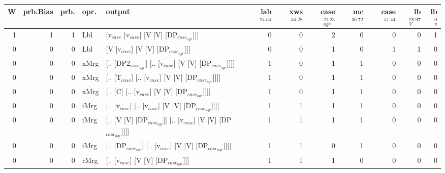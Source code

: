 \begin{tabularx}{\linewidth}{rrrlXrrrrrrr}
\hline
   W &   prb.Bias &   prb. & opr.   & output                                                         &   lab$^{24.64}$ &   xws$^{34.28}$ &   case$_{agr}^{21.23}$ &   mc$^{36.72}$ &   case$^{51.44}$ &   lb$_{V}^{28.97}$ &   lb$_{v}^{0}$ \\
\hline
   1 &       1 &   1 & Lbl  & [v$_{case}$ [v$_{case}$] [V [V] [DP$_{case_{agr}}$]]]                        &             0 &             0 &                  2 &            0 &              0 &              0 &             1 \\
   0 &       0 &   0 & Lbl  & [V [v$_{case}$] [V [V] [DP$_{case_{agr}}$]]]                             &             0 &             0 &                  1 &            0 &              1 &              1 &             0 \\
   0 &       0 &   0 & xMrg & [.. [DP2$_{case_{agr}}$] [.. [v$_{case}$] [V [V] [DP$_{case_{agr}}$]]]]        &             1 &             0 &                  1 &            1 &              0 &              0 &             0 \\
   0 &       0 &   0 & xMrg & [.. [T$_{case}$] [.. [v$_{case}$] [V [V] [DP$_{case_{agr}}$]]]]              &             1 &             0 &                  1 &            1 &              0 &              0 &             0 \\
   0 &       0 &   0 & xMrg & [.. [C] [.. [v$_{case}$] [V [V] [DP$_{case_{agr}}$]]]]                   &             1 &             0 &                  1 &            1 &              0 &              0 &             0 \\
   0 &       0 &   0 & iMrg & [.. [v$_{case}$] [.. [v$_{case}$] [V [V] [DP$_{case_{agr}}$]]]]              &             1 &             1 &                  1 &            1 &              0 &              0 &             0 \\
   0 &       0 &   0 & iMrg & [.. [V [V] [DP$_{case_{agr}}$]] [.. [v$_{case}$] [V [V] [DP$_{case_{agr}}$]]]] &             1 &             1 &                  1 &            1 &              0 &              0 &             0 \\
   0 &       0 &   0 & iMrg & [.. [DP$_{case_{agr}}$] [.. [v$_{case}$] [V [V] [DP$_{case_{agr}}$]]]]         &             1 &             1 &                  0 &            1 &              0 &              0 &             0 \\
   0 &       0 &   0 & rMrg & [.. [v$_{case}$] [V [V] [DP$_{case_{agr}}$]]]                            &             1 &             1 &                  1 &            0 &              0 &              0 &             0 \\
\hline
\end{tabularx}\endgroup\\
